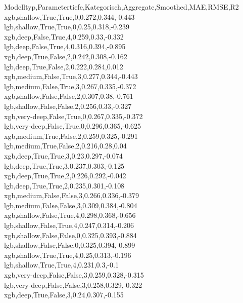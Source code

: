
Modelltyp,Parametertiefe,Kategorisch,Aggregate,Smoothed,MAE,RMSE,R2 \\
xgb,shallow,True,True,0,0.272,0.344,-0.443 \\
lgb,shallow,True,True,0,0.25,0.318,-0.239 \\
xgb,deep,False,True,4,0.259,0.33,-0.332 \\
lgb,deep,False,True,4,0.316,0.394,-0.895 \\
xgb,deep,True,False,2,0.242,0.308,-0.162 \\
lgb,deep,True,False,2,0.222,0.284,0.012 \\
xgb,medium,False,True,3,0.277,0.344,-0.443 \\
lgb,medium,False,True,3,0.267,0.335,-0.372 \\
xgb,shallow,False,False,2,0.307,0.38,-0.761 \\
lgb,shallow,False,False,2,0.256,0.33,-0.327 \\
xgb,very-deep,False,True,0,0.267,0.335,-0.372 \\
lgb,very-deep,False,True,0,0.296,0.365,-0.625 \\
xgb,medium,True,False,2,0.259,0.325,-0.291 \\
lgb,medium,True,False,2,0.216,0.28,0.04 \\
xgb,deep,True,True,3,0.23,0.297,-0.074 \\
lgb,deep,True,True,3,0.237,0.303,-0.125 \\
xgb,deep,True,True,2,0.226,0.292,-0.042 \\
lgb,deep,True,True,2,0.235,0.301,-0.108 \\
xgb,medium,False,False,3,0.266,0.336,-0.379 \\
lgb,medium,False,False,3,0.309,0.384,-0.804 \\
xgb,shallow,False,True,4,0.298,0.368,-0.656 \\
lgb,shallow,False,True,4,0.247,0.314,-0.206 \\
xgb,shallow,False,False,0,0.325,0.393,-0.884 \\
lgb,shallow,False,False,0,0.325,0.394,-0.899 \\
xgb,shallow,True,True,4,0.25,0.313,-0.196 \\
lgb,shallow,True,True,4,0.231,0.3,-0.1 \\
xgb,very-deep,False,False,3,0.259,0.328,-0.315 \\
lgb,very-deep,False,False,3,0.258,0.329,-0.322 \\
xgb,deep,True,False,3,0.24,0.307,-0.155 \\
